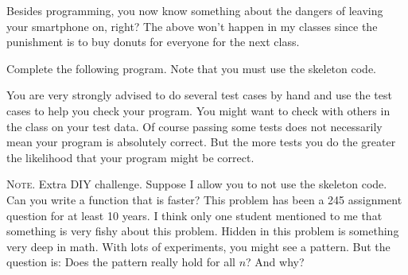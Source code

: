 Besides programming, you now know something about the dangers of
leaving your smartphone on, right?
The above won't happen in my classes since the punishment is to buy
donuts for everyone for the next class.

Complete the following program.
Note that you must use the skeleton code.


You are very strongly
advised to do several test cases by hand and use the test cases
to help you check your program.
You might want to check with others in the class on your test data.
Of course passing some tests does not necessarily mean your program is
absolutely correct.
But the more tests you do the greater the likelihood that your
program might be correct.

\textsc{Note.}
Extra DIY challenge.
Suppose I allow you to not use the skeleton code.
Can you write a function that is faster?
This problem has been a 245 assignment question for at least
10 years.
I think only one student mentioned to me that something
is very fishy about this problem.
Hidden in this problem is something very deep in math.
With lots of experiments, you might see a pattern.
But the question is: Does the pattern really hold for all $n$? And why?

